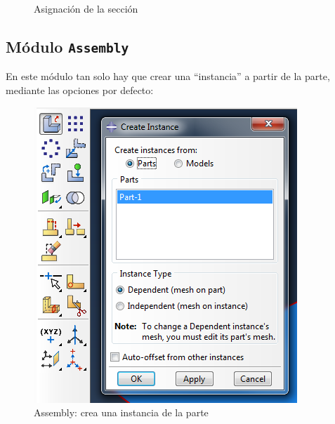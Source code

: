 \documentclass[spanish,a4paper,12pt]{article}
\begin{document}
\begin{figure}[h!tp]
\caption{Asignación de la sección}
\label{fig:section-assign}
\end{figure}
\clearpage

\subsection{Módulo \texttt{Assembly}}

En este módulo tan solo hay que crear una ``instancia'' a partir de la parte, mediante las opciones por defecto:
\begin{figure}[h!tp]
\centering
\includegraphics[scale=0.4]{capturas/14-assembly.png}
\caption{Assembly: crea una instancia de la parte}
\label{fig:assembly}
\end{figure}
\end{document}
